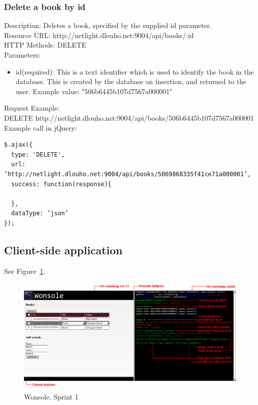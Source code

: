 \subsubsection{Delete a book by id}
Description: Deletes a book, specified by the supplied id parameter.	\\
\newline
Resource URL: http://netlight.dlouho.net:9004/api/books/:id 	\\
HTTP Methods: DELETE		\\
Parameters: 			
\begin{itemize}

\item id(required): This is a text identifier which is used to identify the book in the database. This is created by the database on insertion, and returned to the user. Example value: "506b6445b107d7567a000001"

\end{itemize}
Request Example:		\\
DELETE	http://netlight.dlouho.net:9004/api/books/506b6445b107d7567a000001	\\
\newline
Example call in jQuery:
\begin{verbatim}
$.ajax({
  type: 'DELETE',
  url: ‘http://netlight.dlouho.net:9004/api/books/5069868335f41ce71a000001’, 
  success: function(response){
  
  },
  dataType: ’json’
});
\end{verbatim}



\subsection{Client-side application}

See Figure~\ref{figure:Wonsole-Sprint1}.

\begin{figure}
\centering
\includegraphics[width=6in]{image/Wonsole-Sprint1.png}
\caption{Wonsole, Sprint 1}
\label{figure:Wonsole-Sprint1}
\end{figure}

